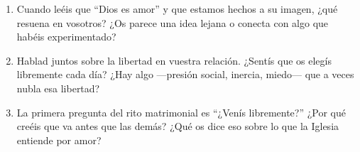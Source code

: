 \paracaminar

\begin{enumerate}
  \item Cuando leéis que ``Dios es amor'' y que estamos hechos a su imagen, ¿qué resuena en vosotros? ¿Os parece una idea lejana o conecta con algo que habéis experimentado?

  \item Hablad juntos sobre la libertad en vuestra relación. ¿Sentís que os elegís libremente cada día? ¿Hay algo ---presión social, inercia, miedo--- que a veces nubla esa libertad?

  \item La primera pregunta del rito matrimonial es ``¿Venís libremente?'' ¿Por qué creéis que va antes que las demás? ¿Qué os dice eso sobre lo que la Iglesia entiende por amor?
\end{enumerate}

